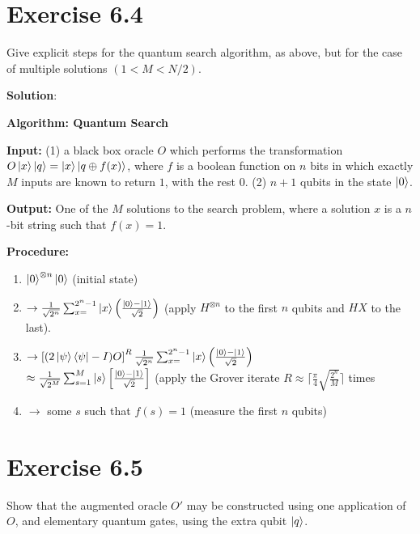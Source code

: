 \documentclass{book}
\begin{document}
\section*{Exercise 6.4}
    Give explicit steps for the quantum search algorithm, as above, but for the case of multiple solutions $(1<M<N/2)$.
    
    \textbf{Solution}: 
    
    \textbf{Algorithm: Quantum Search} \par
    \textbf{Input:} (1) a black box oracle $O$ which performs the transformation $O\ket{x}\ket{q}=\ket{x}\ket{q\oplus f(x)}$, where $f$ is a boolean function on $n$ bits in which exactly $M$ inputs are known to return $1$, with the rest 0. (2) $n+1$ qubits in the state $\ket{0}$. \par
    
    \textbf{Output:} One of the $M$ solutions to the search problem, where a solution $x$ is a $n$-bit string such that $f(x) = 1$. \par
    
    \textbf{Procedure:}\par
    \begin{enumerate}
        \item $\ket{0}^{\otimes n}\ket{0}$ (initial state)
        \item $\rightarrow \frac{1}{\sqrt{2^n}} \sum_{x=}^{2^n-1} \ket{x} \left(\frac{\ket{0}-\ket{1}}{\sqrt{2}}\right)$ (apply $H^{\otimes n}$ to the first $n$ qubits and $HX$ to the last). 
        \item $\rightarrow \left[(2\ket{\psi}\bra{\psi}-I)O\right]^R \frac{1}{\sqrt{2^n}} \sum_{x=}^{2^n-1} \ket{x} \left(\frac{\ket{0}-\ket{1}}{\sqrt{2}}\right)$ \\
        $\approx \frac{1}{\sqrt{2^M}}\sum_{s=1}^M \ket{s} \left[\frac{\ket{0}-\ket{1}}{\sqrt{2}}\right]$ (apply the Grover iterate $R\approx \lceil\frac{\pi}{4}\sqrt{\frac{2^n}{M}}\rceil$ times
        \item $\rightarrow$ some $s$ such that $f(s) = 1$ (measure the first $n$ qubits)
    \end{enumerate}
    
    \section*{Exercise 6.5}
        Show that the augmented oracle $O'$ may be constructed using one application of $O$, and elementary quantum gates, using the extra qubit $\ket{q}$.
        
\end{document}
